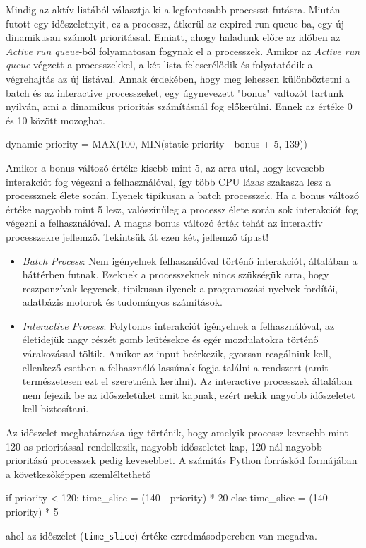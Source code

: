 
Mindig az aktív listából választja ki a legfontosabb processzt futásra. Miután futott egy időszeletnyit, ez a processz, átkerül az expired run queue-ba, egy új dinamikusan számolt prioritással.
Emiatt, ahogy haladunk előre az időben az \textit{Active run queue}-ból folyamatosan fogynak el a processzek.  Amikor az \textit{Active run queue} végzett a processzekkel, a két lista felcserélődik és folyatatódik a végrehajtás az új listával.
Annak érdekében, hogy meg lehessen különböztetni a batch és az interactive processzeket, egy úgynevezett "bonus" valtozót tartunk nyilván, ami a dinamikus prioritás számításnál fog előkerülni. Ennek az értéke 0 és 10 között mozoghat.
\begin{cpp}
dynamic priority = MAX(100, MIN(static priority - bonus + 5, 139))
\end{cpp}
Amikor a bonus változó értéke kisebb mint 5, az arra utal, hogy kevesebb interakciót fog végezni a felhasználóval, így több CPU lázas szakasza lesz a processznek élete során. Ilyenek tipikusan a batch processzek.
Ha a bonus változó értéke nagyobb mint 5 lesz, valószínűleg a processz élete során sok interakciót fog végezni a felhasználóval. A magas bonus változó érték tehát az interaktív processzekre jellemző. Tekintsük át ezen két, jellemző típust!
\begin{itemize}
\item \textit{Batch Process}: Nem igényelnek felhasználóval történő interakciót, általában a háttérben futnak. Ezeknek a processzeknek nincs szükségük arra, hogy reszponzívak legyenek, tipikusan ilyenek a programozási nyelvek fordítói, adatbázis motorok és tudományos számítások.
\item \textit{Interactive Process}: Folytonos interakciót igényelnek a felhasználóval, az életidejük nagy részét gomb leütésekre és egér mozdulatokra történő várakozással töltik.
Amikor az input beérkezik, gyorsan reagálniuk kell, ellenkező esetben a felhasználó lassúnak fogja találni a rendszert (amit természetesen ezt el szeretnénk kerülni).
Az interactive processzek általában nem fejezik be az időszeletüket amit kapnak, ezért nekik nagyobb időszeletet kell biztosítani.
\end{itemize}

Az időszelet meghatározása úgy történik, hogy amelyik processz kevesebb mint 120-as prioritással rendelkezik, nagyobb időszeletet kap, 120-nál nagyobb prioritású processzek pedig kevesebbet. A számítás Python forráskód formájában a következőképpen szemléltethető
\begin{python}
if priority < 120:
    time_slice = (140 - priority) * 20
else
    time_slice = (140 - priority) * 5
\end{python}
ahol az időszelet (\texttt{time\_slice}) értéke ezredmásodpercben van megadva.


